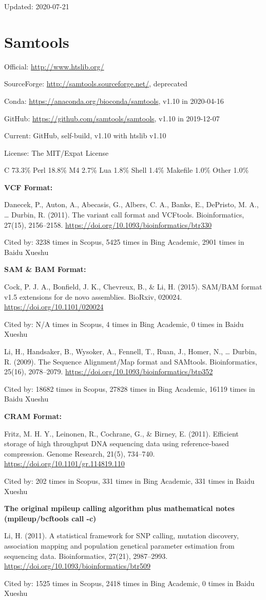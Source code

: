 \documentclass[]{article}
\newcommand{\cb}[3]{\par Cited by: {\color{blue}\Huge #1} times in Scopus, {\color{blue}\Huge #2} times in Bing Academic, {\color{blue}\Huge #3} times in Baidu Xueshu}
\begin{document}
Updated: 2020-07-21

\section{Samtools}

Official: \url{http://www.htslib.org/}

SourceForge: \url{http://samtools.sourceforge.net/}, deprecated

Conda: \url{https://anaconda.org/bioconda/samtools}, v1.10 in 2020-04-16

GitHub: \url{https://github.com/samtools/samtools}, v1.10 in 2019-12-07

Current: GitHub, self-build, v1.10 with htslib v1.10

License: The MIT/Expat License

C 73.3\% Perl 18.8\% M4 2.7\% Lua 1.8\% Shell 1.4\% Makefile 1.0\% Other 1.0\%

\textbf{VCF Format:}

Danecek, P., Auton, A., Abecasis, G., Albers, C. A., Banks, E., DePristo, M. A., … Durbin, R. (2011). The variant call format and VCFtools. Bioinformatics, 27(15), 2156–2158. \url{https://doi.org/10.1093/bioinformatics/btr330} \cb{3238}{5425}{2901}

\textbf{SAM \& BAM Format:}

Cock, P. J. A., Bonfield, J. K., Chevreux, B., \& Li, H. (2015). SAM/BAM format v1.5 extensions for de novo assemblies. BioRxiv, 020024. \url{https://doi.org/10.1101/020024} \cb{N/A}{4}{0}

Li, H., Handsaker, B., Wysoker, A., Fennell, T., Ruan, J., Homer, N., … Durbin, R. (2009). The Sequence Alignment/Map format and SAMtools. Bioinformatics, 25(16), 2078–2079. \url{https://doi.org/10.1093/bioinformatics/btp352} \cb{18682}{27828}{16119}

\textbf{CRAM Format:}

Fritz, M. H. Y., Leinonen, R., Cochrane, G., \& Birney, E. (2011). Efficient storage of high throughput DNA sequencing data using reference-based compression. Genome Research, 21(5), 734–740. \url{https://doi.org/10.1101/gr.114819.110}\cb{202}{331}{331}

\textbf{The original mpileup calling algorithm plus mathematical notes (mpileup/bcftools call -c)}

Li, H. (2011). A statistical framework for SNP calling, mutation discovery, association mapping and population genetical parameter estimation from sequencing data. Bioinformatics, 27(21), 2987–2993. \url{https://doi.org/10.1093/bioinformatics/btr509}\cb{1525}{2418}{0}
\end{document}
